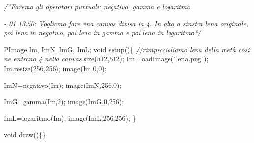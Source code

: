 \documentclass[
]{article}
\newenvironment{Shaded}{}{}
\newcommand{\CommentTok}[1]{\textcolor[rgb]{0.38,0.63,0.69}{\textit{#1}}}
\newcommand{\DataTypeTok}[1]{\textcolor[rgb]{0.56,0.13,0.00}{#1}}
\newcommand{\DecValTok}[1]{\textcolor[rgb]{0.25,0.63,0.44}{#1}}
\newcommand{\FunctionTok}[1]{\textcolor[rgb]{0.02,0.16,0.49}{#1}}
\newcommand{\NormalTok}[1]{#1}
\newcommand{\OperatorTok}[1]{\textcolor[rgb]{0.40,0.40,0.40}{#1}}
\newcommand{\StringTok}[1]{\textcolor[rgb]{0.25,0.44,0.63}{#1}}
\begin{document}
\begin{Shaded}
\begin{Highlighting}[]
\CommentTok{/*Faremo gli operatori puntuali: negativo, gamma e logaritmo}

\CommentTok{{-} 01.13.50: Vogliamo fare una canvas divisa in 4.}
\CommentTok{  In alto a sinstra lena originale, poi lena in negativo, poi lena in gamma e poi lena in logaritmo*/}

\NormalTok{PImage Im}\OperatorTok{,}\NormalTok{ ImN}\OperatorTok{,}\NormalTok{ ImG}\OperatorTok{,}\NormalTok{ ImL}\OperatorTok{;}
\DataTypeTok{void} \FunctionTok{setup}\OperatorTok{()\{}
 \CommentTok{//rimpiccioliamo lena della metà cosi ne entrano 4 nella canvas}
 \FunctionTok{size}\OperatorTok{(}\DecValTok{512}\OperatorTok{,}\DecValTok{512}\OperatorTok{);}
\NormalTok{ Im}\OperatorTok{=}\FunctionTok{loadImage}\OperatorTok{(}\StringTok{"lena.png"}\OperatorTok{);}
\NormalTok{ Im}\OperatorTok{.}\FunctionTok{resize}\OperatorTok{(}\DecValTok{256}\OperatorTok{,}\DecValTok{256}\OperatorTok{);}
 \FunctionTok{image}\OperatorTok{(}\NormalTok{Im}\OperatorTok{,}\DecValTok{0}\OperatorTok{,}\DecValTok{0}\OperatorTok{);}
  
\NormalTok{  ImN}\OperatorTok{=}\FunctionTok{negativo}\OperatorTok{(}\NormalTok{Im}\OperatorTok{);}
  \FunctionTok{image}\OperatorTok{(}\NormalTok{ImN}\OperatorTok{,}\DecValTok{256}\OperatorTok{,}\DecValTok{0}\OperatorTok{);}
  
\NormalTok{  ImG}\OperatorTok{=}\FunctionTok{gamma}\OperatorTok{(}\NormalTok{Im}\OperatorTok{,}\DecValTok{2}\OperatorTok{);}
  \FunctionTok{image}\OperatorTok{(}\NormalTok{ImG}\OperatorTok{,}\DecValTok{0}\OperatorTok{,}\DecValTok{256}\OperatorTok{);}
  
\NormalTok{  ImL}\OperatorTok{=}\FunctionTok{logaritmo}\OperatorTok{(}\NormalTok{Im}\OperatorTok{);}
  \FunctionTok{image}\OperatorTok{(}\NormalTok{ImL}\OperatorTok{,}\DecValTok{256}\OperatorTok{,}\DecValTok{256}\OperatorTok{);}
\OperatorTok{\}}

\DataTypeTok{void} \FunctionTok{draw}\OperatorTok{()\{\}}


\end{Highlighting}
\end{Shaded}
\end{document}
